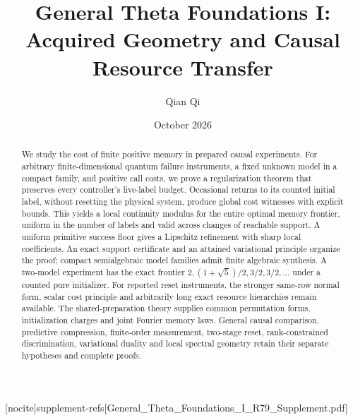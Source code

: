 
[nocite]{supplement-refs}[General_Theta_Foundations_I_R79_Supplement.pdf]
\title[Acquired geometry and causal resource transfer]{General Theta Foundations I:\\Acquired Geometry and Causal Resource Transfer}
\author{Qian Qi}\date{October 2026}

\begin{abstract}
We study the cost of finite positive memory in prepared causal
experiments.  For arbitrary finite-dimensional quantum failure
instruments, a fixed unknown model in a compact family, and positive
call costs, we prove a regularization theorem that preserves every
controller's live-label budget.  Occasional returns to its counted
initial label, without resetting the physical system, produce global
cost witnesses with explicit bounds.  This yields a local continuity
modulus for the entire optimal memory frontier, uniform in the number
of labels and valid across changes of reachable support.  A uniform
primitive success floor gives a Lipschitz refinement with sharp local
coefficients.  An exact
support certificate and an attained variational principle organize the
proof; compact semialgebraic model families admit finite algebraic
synthesis.  A two-model experiment has the exact frontier
$2,(1+\sqrt5)/2,3/2,3/2,\ldots$ under a counted pure initializer.
For reported reset instruments, the stronger same-row normal form,
scalar cost principle and arbitrarily long exact resource hierarchies
remain available.  The shared-preparation theory supplies common
permutation forms, initialization charges and joint Fourier memory
laws.  General causal comparison, predictive compression, finite-order
measurement, two-stage reset, rank-constrained discrimination,
variational duality and local spectral geometry retain their separate
hypotheses and complete proofs.
\end{abstract}
\maketitle















